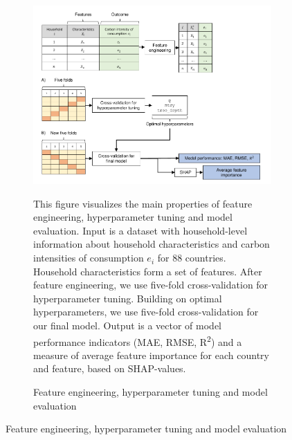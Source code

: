 \begin{figure}[ht!]\ContinuedFloat
   \begin{subfigure}[b]{\textwidth}
  \centering
      \caption{Feature engineering, hyperparameter tuning and model evaluation} \label{fig:data_visualisation_2}
  \includegraphics{1_Figures/Figures_Appendix/Graphical representation of data work_2.pdf}
  \begin{subcaption2}
    This figure visualizes the main properties of feature engineering, hyperparameter tuning and model evaluation. Input is a dataset with household-level information about household characteristics and carbon intensities of consumption $e_{i}$ for 88 countries. Household characteristics form a set of features. After feature engineering, we use five-fold cross-validation for hyperparameter tuning. Building on optimal hyperparameters, we use five-fold cross-validation for our final model. Output is a vector of model performance indicators (MAE, RMSE, R\textsuperscript{2}) and a measure of average feature importance for each country and feature, based on SHAP-values.
  \end{subcaption2}
\end{subfigure}
\end{figure}

\clearpage

